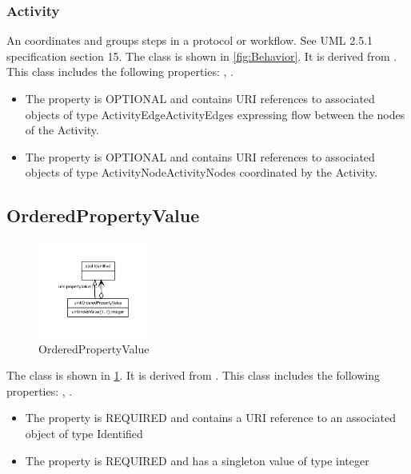\subsubsection{Activity}%
\label{sec:uml:Activity}%
An  coordinates and groups steps in a protocol or workflow. See UML 2.5.1 specification section 15.%
\newline%
\linebreak%
The  class is shown in \ref{fig:Behavior}. It is derived from .%
This class includes the following properties: , . %
\begin{itemize}%
\item%
The  property is OPTIONAL and contains URI references to associated objects of type ActivityEdgeActivityEdges expressing flow between the nodes of the Activity.%
\item%
The  property is OPTIONAL and contains URI references to associated objects of type ActivityNodeActivityNodes coordinated by the Activity.%
\end{itemize}%
\subsection{OrderedPropertyValue}%
\label{sec:uml:OrderedPropertyValue}%


\begin{figure}[h!]%
\centering%
\includegraphics[width=0.32468085106382977\textwidth]{uml_classes/OrderedPropertyValue_abstraction_hierarchy.pdf}%
\caption{OrderedPropertyValue}%
\label{fig:OrderedPropertyValue}%
\end{figure}

%
The  class is shown in \ref{fig:OrderedPropertyValue}. It is derived from .%
This class includes the following properties: , . %
\begin{itemize}%
\item%
The  property is REQUIRED and contains a URI reference to an associated object of type Identified%
\item%
The  property is REQUIRED and has a singleton value of type integer%
\end{itemize}%

